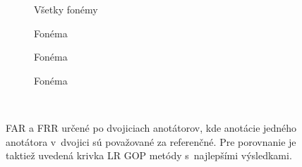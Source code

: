 \begin{figure}[ht!]
\centering
\begin{subfigure}[b]{0.49\textwidth}
    \resizebox{\textwidth}{!}{}
    \caption{Všetky fonémy}
\end{subfigure}
\begin{subfigure}[b]{0.49\textwidth}
    \resizebox{\textwidth}{!}{}
    \caption{Fonéma }
\end{subfigure}
\par\vspace{2em}
\begin{subfigure}[b]{0.49\textwidth}
    \resizebox{\textwidth}{!}{}
    \caption{Fonéma }
\end{subfigure}
\begin{subfigure}[b]{0.49\textwidth}
    \resizebox{\textwidth}{!}{}
    \caption{Fonéma }
\end{subfigure}\\
\caption{FAR a FRR určené po dvojiciach anotátorov, kde anotácie jedného anotátora v~dvojici sú považované za referenčné. Pre porovnanie je taktiež uvedená krivka LR GOP metódy s~najlepšími výsledkami.}
\label{fig:inter-judge}
\end{figure}